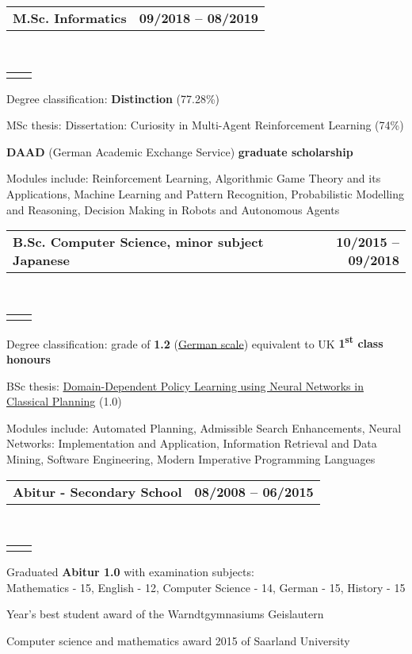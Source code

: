 \documentclass[]{lukas-cv}
\makeatletter
\newcommand{\headerrow}[2]
{\begin{tabular*}{\linewidth}{l@{\extracolsep{\fill}}r}
	\fontspec{Helvetica}\fontsize{12pt}{12pt}\selectfont\bfseries{\color{subheadings}#1} &
	\fontspec{Helvetica}\fontsize{12pt}{12pt}\selectfont\bfseries{\color{subheadings}#2} \\
\end{tabular*}}
\newcommand{\locationrow}[2]
{\begin{tabular*}{\linewidth}{l@{\extracolsep{\fill}}r}
        \color{headings}\scshape\fontspec{Heiti TC Medium}\fontsize{10pt}{12pt}\selectfont{#1}  &
        \color{headings}\scshape\fontspec{Heiti TC Medium}\fontsize{10pt}{12pt}\selectfont{#2}  \\
\end{tabular*}}
\makeatother
\begin{document}
\noindent
\headerrow{M.Sc. Informatics}{09/2018 -- 08/2019}
\\
\locationrow{University of Edinburgh}{Edinburgh, United Kingdom}
\begin{tightitemize}{1.7em}
    \item Degree classification: \textbf{Distinction} (77.28\%)
    \item MSc thesis: Dissertation: Curiosity in Multi-Agent Reinforcement Learning (74\%)
    \item \textbf{DAAD} (German Academic Exchange Service) \textbf{graduate scholarship}
    \item Modules include: Reinforcement Learning, Algorithmic Game Theory and its Applications, Machine Learning and 
    Pattern Recognition, Probabilistic Modelling and Reasoning, Decision Making in Robots and Autonomous Agents
\end{tightitemize}
\largesectionsep

\noindent
\headerrow{B.Sc. Computer Science, minor subject Japanese}{10/2015 -- 09/2018}
\\
\locationrow{Saarland University}{Saarbrücken, Germany}
\begin{tightitemize}{1.7em}
    \item Degree classification: grade of \textbf{1.2} (\href{https://en.wikipedia.org/wiki/Academic_grading_in_Germany}{German scale}) equivalent to UK \textbf{1\textsuperscript{st} class honours}
    \item BSc thesis: \href{https://www.lukaschaefer.de/assets/files/thesis.pdf}{Domain-Dependent Policy Learning using Neural Networks in Classical Planning} (1.0)
    \item Modules include: Automated Planning, Admissible Search Enhancements, Neural Networks: Implementation and Application, Information Retrieval and Data Mining, Software Engineering, Modern Imperative Programming Languages
\end{tightitemize}
\largesectionsep

\noindent
\headerrow{Abitur - Secondary School}{08/2008 -- 06/2015}
\\
\locationrow{Warndtgymnasium Geislautern, Völklingen}{Geislautern, Germany}
\begin{tightitemize}{1.7em}
    \item Graduated \textbf{Abitur 1.0} with examination subjects:\\
    Mathematics - 15, English - 12, Computer Science - 14, German - 15, History - 15
    \item Year's best student award of the Warndtgymnasiums Geislautern
    \item Computer science and mathematics award 2015 of Saarland University
\end{tightitemize}
\largesectionsep
\end{document}
